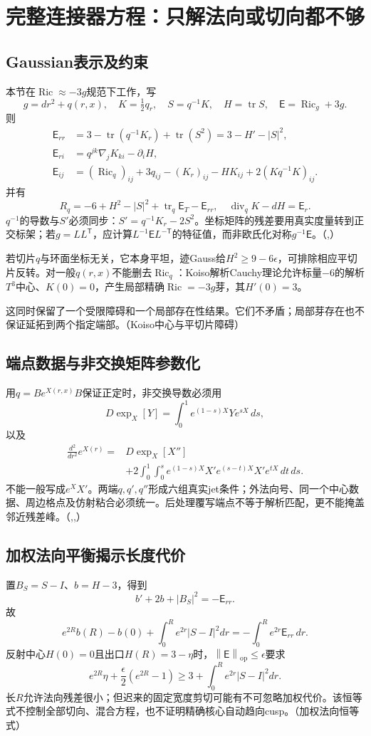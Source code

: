 \documentclass[UTF8,fontset=fandol,zihao=-4]{ctexart}
\theoremstyle{research}
\DeclareMathOperator{\Ric}{Ric}
\DeclareMathOperator{\tr}{tr}
\DeclareMathOperator{\diver}{div}
\newcommand{\op}{\mathrm{op}}
\newcommand{\norm}[1]{\left\|#1\right\|}
\numberwithin{equation}{section}
\begin{document}
\section{完整连接器方程：只解法向或切向都不够}
\subsection{Gaussian表示及约束}
本节在$\Ric\approx-3g$规范下工作，写
\[
g=dr^2+q(r,x),\quad K=\tfrac12q_r,\quad S=q^{-1}K,\quad H=\tr S,
\quad\mathsf E=\Ric_g+3g.
\]
则
\begin{align}
\mathsf E_{rr}&=3-\tr(q^{-1}K_r)+\tr(S^2)=3-H'-|S|^2,\\
\mathsf E_{ri}&=q^{jk}\nabla_jK_{ki}-\partial_iH,\\
\mathsf E_{ij}&=(\Ric_q)_{ij}+3q_{ij}-(K_r)_{ij}
-HK_{ij}+2(Kq^{-1}K)_{ij}.
\end{align}
并有
\[
R_q=-6+H^2-|S|^2+\tr_q\mathsf E_T-\mathsf E_{rr},
\quad\diver_qK-dH=\mathsf E_r.
\]
$q^{-1}$的导数与$S'$必须同步：$S'=q^{-1}K_r-2S^2$。坐标矩阵的残差要用真实度量转到正交标架；若$g=LL^{\mathsf T}$，应计算$L^{-1}\mathsf E L^{-\mathsf T}$的特征值，而非欧氏化对称$g^{-1}\mathsf E$。\cite{G}（,）

若切片$q$与环面坐标无关，它本身平坦，迹Gauss给$H^2\ge9-6\epsilon$，可排除相应平切片反转。对一般$q(r,x)$不能删去$\Ric_q$：Koiso解析Cauchy理论允许标量$-6$的解析$T^3$中心、$K(0)=0$，产生局部精确$\Ric=-3g$芽，其$H'(0)=3$。

这同时保留了一个受限障碍和一个局部存在性结果。它们不矛盾；局部芽存在也不保证延拓到两个指定端部。\cite{G}（Koiso中心与平切片障碍）\cite{Koiso}

\subsection{端点数据与非交换矩阵参数化}
用$q=B e^{X(r,x)}B$保证正定时，非交换导数必须用
\[
D\exp_X[Y]=\int_0^1e^{(1-s)X}Y e^{sX}\,ds,
\]
以及
\begin{align}
\frac{d^2}{dr^2}e^{X(r)}
={}&D\exp_X[X'']\\
&+2\int_0^1\int_0^s
 e^{(1-s)X}X'e^{(s-t)X}X'e^{tX}\,dt\,ds.
\end{align}
不能一般写成$e^X X'$。两端$q,q',q''$形成六组真实jet条件；外法向号、同一个中心数据、周边格点及仿射粘合必须统一。后处理覆写端点不等于解析匹配，更不能掩盖邻近残差峰。\cite{G}（,,）

\subsection{加权法向平衡揭示长度代价}
置$B_S=S-I$、$b=H-3$，得到
\[
b'+2b+|B_S|^2=-\mathsf E_{rr}.
\]
故
\begin{equation}\label{eq:normalbalance}
e^{2R}b(R)-b(0)+\int_0^Re^{2r}|S-I|^2dr
=-\int_0^Re^{2r}\mathsf E_{rr}\,dr.
\end{equation}
反射中心$H(0)=0$且出口$H(R)=3-\eta$时，$\norm{\mathsf E}_\op\le\epsilon$要求
\[
e^{2R}\eta+\frac\epsilon2(e^{2R}-1)
\ge3+\int_0^Re^{2r}|S-I|^2dr.
\]
长$R$允许法向残差很小；但迟来的固定宽度剪切可能有不可忽略加权代价。该恒等式不控制全部切向、混合方程，也不证明精确核心自动趋向cusp。\cite{G}（加权法向恒等式）
\end{document}
